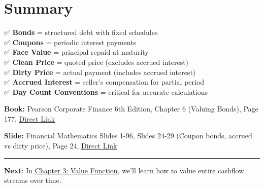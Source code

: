 \documentclass[
  letterpaper,
]{scrbook}
\begin{document}
\section{Summary}\label{summary-1}

✅ \textbf{Bonds} = structured debt with fixed schedules\\
✅ \textbf{Coupons} = periodic interest payments\\
✅ \textbf{Face Value} = principal repaid at maturity\\
✅ \textbf{Clean Price} = quoted price (excludes accrued interest)\\
✅ \textbf{Dirty Price} = actual payment (includes accrued interest)\\
✅ \textbf{Accrued Interest} = seller's compensation for partial
period\\
✅ \textbf{Day Count Conventions} = critical for accurate calculations

\begin{tcolorbox}[enhanced jigsaw, toptitle=1mm, colbacktitle=quarto-callout-caution-color!10!white, opacityback=0, leftrule=.75mm, breakable, colframe=quarto-callout-caution-color-frame, toprule=.15mm, opacitybacktitle=0.6, coltitle=black, bottomrule=.15mm, colback=white, arc=.35mm, titlerule=0mm, rightrule=.15mm, left=2mm, title=\textcolor{quarto-callout-caution-color}{\faFire}\hspace{0.5em}{References}, bottomtitle=1mm]

\textbf{Book:} Pearson Corporate Finance 6th Edition, Chapter 6 (Valuing
Bonds), Page 177,
\href{https://cdn.jsdelivr.net/gh/mrbungie/financial_maths@main/resources/books/pearson_corporate_finance_6th.pdf\#page=177}{Direct
Link}

\textbf{Slide:} Financial Mathematics Slides 1-96, Slides 24-29 (Coupon
bonds, accrued vs dirty price), Page 24,
\href{https://cdn.jsdelivr.net/gh/mrbungie/financial_maths@main/resources/slideshows/25_09_30_FinancialMathematics_Slides_1_96.pdf\#page=24}{Direct
Link}

\end{tcolorbox}

\begin{center}\rule{0.5\linewidth}{0.5pt}\end{center}

\textbf{Next}: In \href{value_function.qmd}{Chapter 3: Value Function},
we'll learn how to value entire cashflow streams over time.

\end{document}
